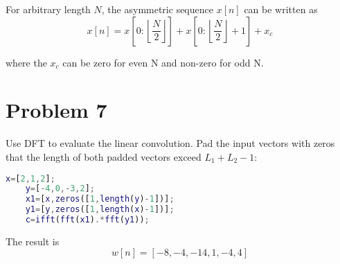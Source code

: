 \documentclass{article}
\begin{document}
For arbitrary length \( N \), the asymmetric sequence \( x[n] \) can be written as
\begin{equation}
	x[n]=x[0:\left\lfloor \frac{N}{2} \right\rfloor ]+x[0:\left\lfloor \frac{N}{2} \right\rfloor+1]+x_{c}
\end{equation}

where the \( x_{c} \) can be zero for even N and non-zero for odd N.

\section{Problem 7}

Use DFT to evaluate the linear convolution. Pad the input vectors with zeros that the length of both padded vectors exceed \( L_{1}+L_{2}-1 \):
\begin{lstlisting}[language=matlab,style=matlab]
    x=[2,1,2];
    y=[-4,0,-3,2];
    x1=[x,zeros([1,length(y)-1])];
    y1=[y,zeros([1,length(x)-1])];
    c=ifft(fft(x1).*fft(y1));
\end{lstlisting}

The result is
\begin{equation}
	w[n]=[-8,-4,-14,1,-4,4]
\end{equation}
\end{document}
